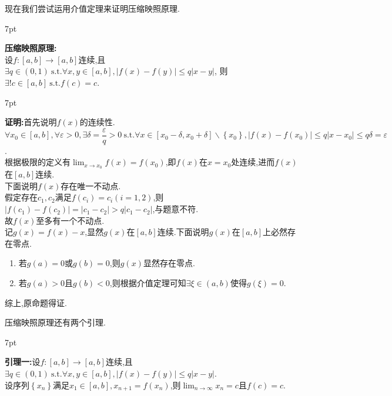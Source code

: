 \documentclass{ctexart}
\newcommand{\st}{\ \text{s.t.}}
\newenvironment{formal}{%
\def\FrameCommand{%
\hspace{1pt}%
{\color{DarkBlue}\vrule width 2pt}%
{\color{formalshade}\vrule width 4pt}%
\colorbox{formalshade}%
}%
\MakeFramed{\advance\hsize-\width\FrameRestore}%
\noindent\hspace{-4.55pt}%
\begin{adjustwidth}{}{7pt}%
\vspace{2pt}\vspace{2pt}%
}
{%
\vspace{2pt}\end{adjustwidth}\endMakeFramed%
}
\newenvironment{solution}{%
\def\FrameCommand{%
\hspace{1pt}%
{\color{solutionline}\vrule width 2pt}%
{\color{solutionshade}\vrule width 4pt}%
\colorbox{solutionshade}%
}%
\MakeFramed{\advance\hsize-\width\FrameRestore}%
\noindent\hspace{-4.55pt}%
\begin{adjustwidth}{}{7pt}%
\vspace{2pt}\vspace{2pt}%
}
{%
\vspace{2pt}\end{adjustwidth}\endMakeFramed%
}
\begin{document}
现在我们尝试运用介值定理来证明压缩映照原理.
\begin{formal}
    \textbf{压缩映照原理:} \\
    设$f:[a,b]\to[a,b]$连续,且$\exists q\in(0,1)\st\forall x,y\in[a,b],\left\lvert f(x)-f(y)\right\rvert\leqslant q\left\lvert x-y\right\rvert$,
    则$\exists!c\in[a,b]\st f(c)=c$.
\end{formal}
\begin{solution}
    \textbf{证明:}首先说明$f(x)$的连续性.\\
    $\forall x_0\in [a,b],\forall \varepsilon>0,\exists \delta=\dfrac{\varepsilon}{q}>0\st
    \forall x\in[x_0-\delta,x_0+\delta]\backslash\left\{x_0\right\},
    \left\lvert f(x)-f(x_0)\right\rvert\leqslant q\left\lvert x-x_0\right\rvert\leqslant q\delta=\varepsilon$.\\
    根据极限的定义有$\lim_{x\to x_0}{f(x)}=f(x_0)$,即$f(x)$在$x=x_0$处连续,进而$f(x)$在$[a,b]$连续.\\
    下面说明$f(x)$存在唯一不动点.\\
    假定存在$c_1,c_2$满足$f(c_i)=c_i(i=1,2)$,则
    $\left\lvert f(c_1)-f(c_2)\right\rvert=\left\lvert c_1-c_2\right\rvert >q\left\lvert c_1-c_2\right\rvert$,与题意不符.\\
    故$f(x)$至多有一个不动点.\\
    记$g(x)=f(x)-x$,显然$g(x)$在$[a,b]$连续.下面说明$g(x)$在$[a,b]$上必然存在零点.
    \begin{enumerate}[(1)]
        \item 若$g(a)=0$或$g(b)=0$,则$g(x)$显然存在零点.
        \item 若$g(a)>0$且$g(b)<0$,则根据介值定理可知$\exists\xi\in(a,b)$使得$g(\xi)=0$.
    \end{enumerate}
    综上,原命题得证.
\end{solution}\noindent
压缩映照原理还有两个引理.
\begin{formal}
    \textbf{引理一:}设$f:[a,b]\to[a,b]$连续,且$\exists q\in(0,1)\st\forall x,y\in[a,b],\left\lvert f(x)-f(y)\right\rvert\leqslant q\left\lvert x-y\right\rvert$.\\
    设序列$\left\{ x_n\right\}$满足$x_1\in[a,b],x_{n+1}=f(x_n)$,则$\displaystyle\lim_{n\to\infty}{x_n}=c$且$f(c)=c$.
\end{formal}
\end{document}
